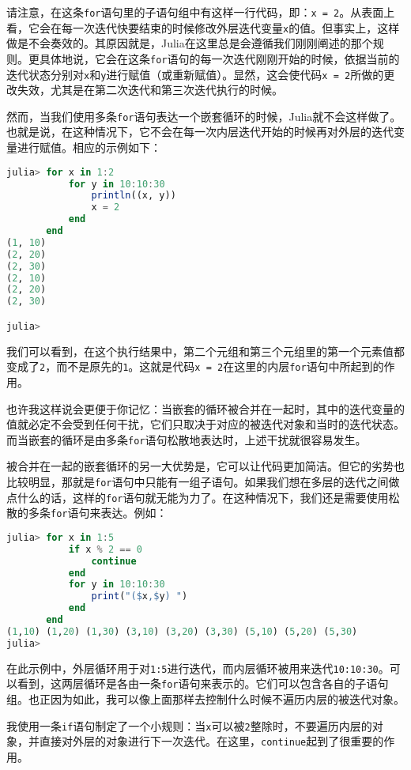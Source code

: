 请注意，在这条\verb|for|语句里的子语句组中有这样一行代码，即：\verb|x = 2|。从表面上看，它会在每一次迭代快要结束的时候修改外层迭代变量\verb|x|的值。但事实上，这样做是不会奏效的。其原因就是，Julia在这里总是会遵循我们刚刚阐述的那个规则。更具体地说，它会在这条\verb|for|语句的每一次迭代刚刚开始的时候，依据当前的迭代状态分别对\verb|x|和\verb|y|进行赋值（或重新赋值）。显然，这会使代码\verb|x = 2|所做的更改失效，尤其是在第二次迭代和第三次迭代执行的时候。

然而，当我们使用多条\verb|for|语句表达一个嵌套循环的时候，Julia就不会这样做了。也就是说，在这种情况下，它不会在每一次内层迭代开始的时候再对外层的迭代变量进行赋值。相应的示例如下：
\begin{lstlisting}[language=julia]
julia> for x in 1:2
           for y in 10:10:30
               println((x, y))
               x = 2
           end
       end
(1, 10)
(2, 20)
(2, 30)
(2, 10)
(2, 20)
(2, 30)

julia> 
\end{lstlisting}

我们可以看到，在这个执行结果中，第二个元组和第三个元组里的第一个元素值都变成了\verb|2|，而不是原先的\verb|1|。这就是代码\verb|x = 2|在这里的内层\verb|for|语句中所起到的作用。

也许我这样说会更便于你记忆：当嵌套的循环被合并在一起时，其中的迭代变量的值就必定不会受到任何干扰，它们只取决于对应的被迭代对象和当时的迭代状态。而当嵌套的循环是由多条\verb|for|语句松散地表达时，上述干扰就很容易发生。

被合并在一起的嵌套循环的另一大优势是，它可以让代码更加简洁。但它的劣势也比较明显，那就是\verb|for|语句中只能有一组子语句。如果我们想在多层的迭代之间做点什么的话，这样的\verb|for|语句就无能为力了。在这种情况下，我们还是需要使用松散的多条\verb|for|语句来表达。例如：
\begin{lstlisting}[language=julia]
julia> for x in 1:5
           if x % 2 == 0
               continue
           end
           for y in 10:10:30
               print("($x,$y) ")
           end
       end
(1,10) (1,20) (1,30) (3,10) (3,20) (3,30) (5,10) (5,20) (5,30) 
julia> 
\end{lstlisting}

在此示例中，外层循环用于对\verb|1:5|进行迭代，而内层循环被用来迭代\verb|10:10:30|。可以看到，这两层循环是各由一条\verb|for|语句来表示的。它们可以包含各自的子语句组。也正因为如此，我可以像上面那样去控制什么时候不遍历内层的被迭代对象。

我使用一条\verb|if|语句制定了一个小规则：当\verb|x|可以被\verb|2|整除时，不要遍历内层的对象，并直接对外层的对象进行下一次迭代。在这里，\verb|continue|起到了很重要的作用。

